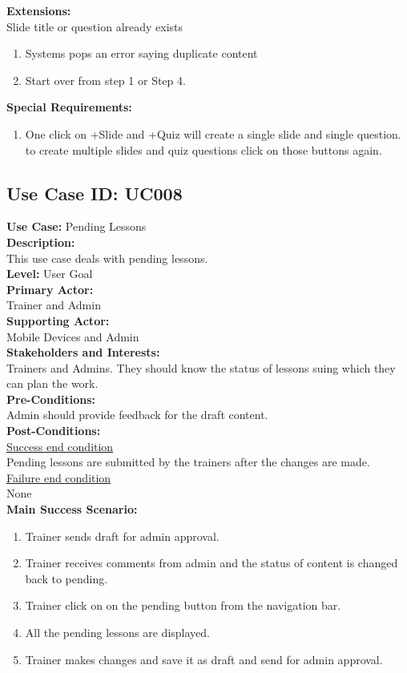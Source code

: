 \documentclass{report}
\begin{document}
\textbf{Extensions:}\\
Slide title or question already exists
\begin{enumerate}
    \item Systems pops an error saying duplicate content
    \item Start over from step 1 or Step 4.
\end{enumerate}
\textbf{Special Requirements:}
\begin{enumerate}
    \item One click on +Slide and +Quiz will create a single slide and single question. to create multiple slides and quiz questions click on those buttons again.
\end{enumerate}

\subsection{\textbf{Use Case ID:} UC008}
\textbf{Use Case:} Pending Lessons\\[0.3cm]
\textbf{Description:}\\
This use case deals with pending lessons.\\[0.3cm]
\textbf{Level:} User Goal\\[0.3cm]
\textbf{Primary Actor:}\\
Trainer and Admin\\[0.3cm]
\textbf{Supporting Actor:}\\
Mobile Devices and Admin\\[0.3cm]
\textbf{Stakeholders and Interests:}\\
Trainers and Admins. They should know the status of lessons suing which they can plan the work.\\[0.3cm]
\textbf{Pre-Conditions:}\\
Admin should provide feedback for the draft content.\\[0.3cm]
\textbf{Post-Conditions:}\\
\underline{Success end condition}\\
Pending lessons are submitted by the trainers after the changes are made.\\[0.3cm]
\underline{Failure end condition}\\
None\\[0.3cm]
\textbf{\large {Main Success Scenario:}}
\begin{enumerate}
    \item Trainer sends draft for admin approval.
    \item Trainer receives comments from admin and the status of content is changed back to pending.
    \item Trainer click on on the pending button from the navigation bar.
    \item All the pending lessons are displayed.
    \item Trainer makes changes and save it as draft and send for admin approval.
\end{enumerate}
\end{document}
